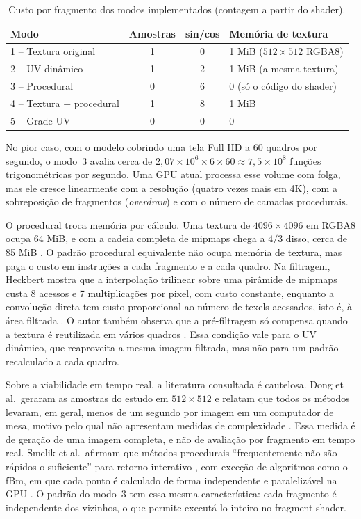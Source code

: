 \begin{table}[H]
\centering
\caption{Custo por fragmento dos modos implementados (contagem a partir do shader).}
\label{tab:custo-modos}
\small
\begin{tabular}{p{4.6cm}ccp{4.4cm}}
\toprule
\textbf{Modo} & \textbf{Amostras} & \textbf{sin/cos} & \textbf{Memória de textura} \\
\midrule
1 -- Textura original & 1 & 0 & 1 MiB (\(512\times512\) RGBA8) \\
2 -- UV dinâmico & 1 & 2 & 1 MiB (a mesma textura) \\
3 -- Procedural & 0 & 6 & 0 (só o código do shader) \\
4 -- Textura + procedural & 1 & 8 & 1 MiB \\
5 -- Grade UV & 0 & 0 & 0 \\
\bottomrule
\end{tabular}
\end{table}

No pior caso, com o modelo cobrindo uma tela Full HD a 60 quadros por segundo, o modo~3 avalia cerca de \(2{,}07\times10^{6}\times6\times60\approx7{,}5\times10^{8}\) funções trigonométricas por segundo. Uma GPU atual processa esse volume com folga, mas ele cresce linearmente com a resolução (quatro vezes mais em 4K), com a sobreposição de fragmentos (\textit{overdraw}) e com o número de camadas procedurais.

O procedural troca memória por cálculo. Uma textura de \(4096\times4096\) em RGBA8 ocupa 64 MiB, e com a cadeia completa de mipmaps chega a \(4/3\) disso, cerca de 85 MiB \cite[p.~9]{heckbert1986}. O padrão procedural equivalente não ocupa memória de textura, mas paga o custo em instruções a cada fragmento e a cada quadro. Na filtragem, Heckbert mostra que a interpolação trilinear sobre uma pirâmide de mipmaps custa 8 acessos e 7 multiplicações por pixel, com custo constante, enquanto a convolução direta tem custo proporcional ao número de texels acessados, isto é, à área filtrada \cite[pp.~8--9, 11]{heckbert1986}. O autor também observa que a pré-filtragem só compensa quando a textura é reutilizada em vários quadros \cite[p.~10]{heckbert1986}. Essa condição vale para o UV dinâmico, que reaproveita a mesma imagem filtrada, mas não para um padrão recalculado a cada quadro.

Sobre a viabilidade em tempo real, a literatura consultada é cautelosa. Dong et al.\ geraram as amostras do estudo em \(512\times512\) \cite[p.~19]{dong2020} e relatam que todos os métodos levaram, em geral, menos de um segundo por imagem em um computador de mesa, motivo pelo qual não apresentam medidas de complexidade \cite[p.~21]{dong2020}. Essa medida é de geração de uma imagem completa, e não de avaliação por fragmento em tempo real. Smelik et al.\ afirmam que métodos procedurais ``frequentemente não são rápidos o suficiente'' para retorno interativo \cite[p.~14]{smelik2014}, com exceção de algoritmos como o fBm, em que cada ponto é calculado de forma independente e paralelizável na GPU \cite[p.~3]{smelik2014}. O padrão do modo~3 tem essa mesma característica: cada fragmento é independente dos vizinhos, o que permite executá-lo inteiro no fragment shader.

